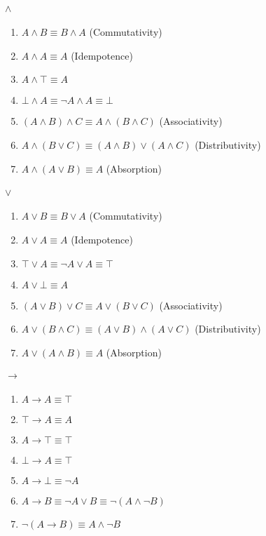 \documentclass[10pt,twoside,twocolumn]{article}
\begin{document}
\paragraph{$\boldsymbol{\land}$}
\begin{enumerate}
\item $A\land B\equiv B\land A$ (Commutativity)
\item $A\land A\equiv A$ (Idempotence)
\item $A\land\top\equiv A$
\item $\bot\land A\equiv\lnot A\land A\equiv\bot$
\item $\left(A\land B\right)\land C\equiv A\land\left(B\land C\right)$
(Associativity)
\item $A\land\left(B\lor C\right)\equiv\left(A\land B\right)\lor\left(A\land C\right)$
(Distributivity)
\item $A\land\left(A\lor B\right)\equiv A$ (Absorption)
\end{enumerate}

\paragraph{$\boldsymbol{\lor}$}
\begin{enumerate}
\item $A\lor B\equiv B\lor A$ (Commutativity)
\item $A\lor A\equiv A$ (Idempotence)
\item $\top\lor A\equiv\lnot A\lor A\equiv\top$
\item $A\lor\bot\equiv A$
\item $\left(A\lor B\right)\lor C\equiv A\lor\left(B\lor C\right)$ (Associativity)
\item $A\lor\left(B\land C\right)\equiv\left(A\lor B\right)\land\left(A\lor C\right)$
(Distributivity)
\item $A\lor\left(A\land B\right)\equiv A$ (Absorption)
\end{enumerate}

\paragraph{$\boldsymbol{\rightarrow}$}
\begin{enumerate}
\item $A\rightarrow A\equiv\top$
\item $\top\rightarrow A\equiv A$
\item $A\rightarrow\top\equiv\top$
\item $\bot\rightarrow A\equiv\top$
\item $A\rightarrow\bot\equiv\lnot A$
\item $A\rightarrow B\equiv\lnot A\lor B\equiv\lnot\left(A\land\lnot B\right)$
\item $\lnot$$\left(A\rightarrow B\right)\equiv A\land\lnot B$
\end{enumerate}
\end{document}
